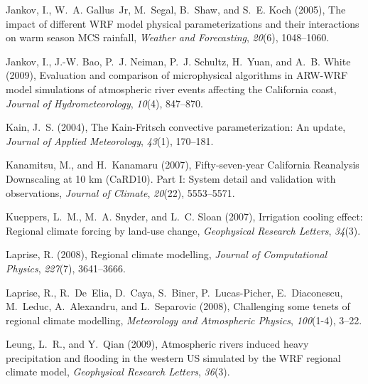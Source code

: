 \documentclass[ms]{agutex}   %
\begin{document}
\begin{article}
\begin{thebibliography}{84}
Jankov, I., W.~A. Gallus~Jr, M.~Segal, B.~Shaw, and S.~E. Koch (2005), {The
  impact of different WRF model physical parameterizations and their
  interactions on warm season MCS rainfall}, \textit{Weather and Forecasting},
  \textit{20}(6), 1048--1060.

Jankov, I., J.-W. Bao, P.~J. Neiman, P.~J. Schultz, H.~Yuan, and A.~B. White
  (2009), {Evaluation and comparison of microphysical algorithms in ARW-WRF
  model simulations of atmospheric river events affecting the California
  coast}, \textit{Journal of Hydrometeorology}, \textit{10}(4), 847--870.

Kain, J.~S. (2004), {The Kain-Fritsch convective parameterization: An update},
  \textit{Journal of Applied Meteorology}, \textit{43}(1), 170--181.

Kanamitsu, M., and H.~Kanamaru (2007), {Fifty-seven-year California Reanalysis
  Downscaling at 10 km (CaRD10). Part I: System detail and validation with
  observations}, \textit{Journal of Climate}, \textit{20}(22), 5553--5571.

Kueppers, L.~M., M.~A. Snyder, and L.~C. Sloan (2007), Irrigation cooling
  effect: Regional climate forcing by land-use change, \textit{Geophysical
  Research Letters}, \textit{34}(3).

Laprise, R. (2008), Regional climate modelling, \textit{Journal of
  Computational Physics}, \textit{227}(7), 3641--3666.

Laprise, R., R.~De~Elia, D.~Caya, S.~Biner, P.~Lucas-Picher, E.~Diaconescu,
  M.~Leduc, A.~Alexandru, and L.~Separovic (2008), Challenging some tenets of
  regional climate modelling, \textit{Meteorology and Atmospheric Physics},
  \textit{100}(1-4), 3--22.

Leung, L.~R., and Y.~Qian (2009), {Atmospheric rivers induced heavy
  precipitation and flooding in the western US simulated by the WRF regional
  climate model}, \textit{Geophysical Research Letters}, \textit{36}(3).


\end{thebibliography}
\end{article}
\end{document}
